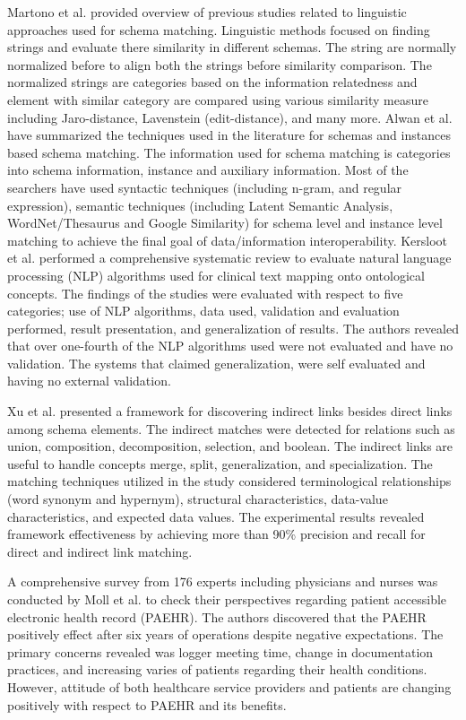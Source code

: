Martono et al. \cite{martono2017review} provided overview of previous studies related to linguistic approaches used for schema matching. Linguistic methods focused on finding strings and evaluate there similarity in different schemas. The string are normally normalized before to align both the strings before similarity comparison. The normalized strings are categories based on the information relatedness and element with similar category are compared using various similarity measure including  Jaro-distance, Lavenstein (edit-distance), and many more. Alwan et al. \cite{alwan2017survey} have summarized the techniques used in the literature for schemas and instances based schema matching. The information used for schema matching is categories into  schema information, instance and auxiliary information. Most of the searchers have used syntactic techniques (including n-gram, and regular expression), semantic techniques (including Latent Semantic Analysis, WordNet/Thesaurus and Google Similarity) for schema level and instance level matching to achieve the final goal of data/information interoperability.  Kersloot et al. \cite{kersloot2020natural} performed a comprehensive systematic review to evaluate natural language processing (NLP) algorithms used for clinical text mapping onto ontological concepts. The findings of the studies were evaluated with respect to five categories; use of NLP algorithms, data used, validation and evaluation performed, result presentation, and generalization of results. The authors revealed that over one-fourth of the NLP algorithms used were not evaluated and have no validation. The systems that claimed generalization, were self evaluated and having no external validation.  

Xu et al. \cite{xu2003discovering} presented a framework for discovering indirect links besides direct links among schema elements. The indirect matches were detected for relations such as union, composition, decomposition, selection, and boolean. The indirect links are useful to handle concepts merge, split, generalization, and specialization. The matching techniques utilized in the study considered terminological relationships (word synonym and hypernym), structural characteristics, data-value characteristics, and expected data values. The experimental results revealed framework effectiveness by achieving more than 90\% precision and recall for direct and indirect link matching. 

A comprehensive survey from 176 experts including physicians and nurses was conducted by Moll et al. \cite{moll2020oncology} to check their perspectives regarding patient accessible electronic health record (PAEHR). The authors discovered that the PAEHR positively effect after six years of operations despite negative expectations. The primary concerns revealed was logger meeting time, change in documentation practices, and increasing varies of patients regarding their health conditions. However, attitude of both healthcare service providers and patients are changing positively with respect to PAEHR and its benefits. 